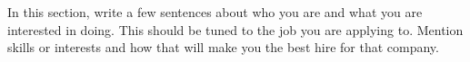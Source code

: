 \documentclass[letter,10pt]{article}
\begin{document}


In this section, write a few sentences about who you are and what you are interested in doing.  This should be tuned to the job you are applying to.  Mention skills or interests and how that will make you the best hire for that company.
\end{document}
